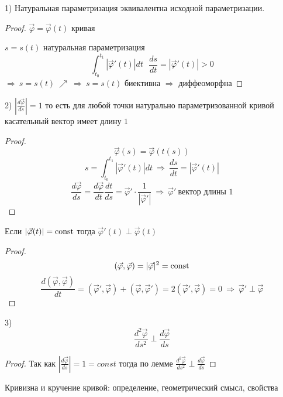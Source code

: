 \begin{block}[Свойства]
  1) Натуральная параметризация эквивалентна исходной параметризации.

  \begin{proof}
    $\vec \varphi = \vec \varphi(t)$ кривая

    $s = s(t)$ натуральная параметризация
    $$
    \int_{t_0}^{t_1} |\vec \varphi'(t)| dt ~~~
    \frac{ds}{dt} = |\vec \varphi'(t)| > 0
    $$
    $\Rightarrow ~ s = s(t) ~ \nearrow ~ \Rightarrow ~ s = s(t)$ биективна
    $\Rightarrow$ диффеоморфна
  \end{proof}

  2) $\left| \frac{d \vec \varphi}{ds} \right| = 1$ то есть для любой точки
  натурально параметризованной кривой касательный вектор имеет длину $1$

  \begin{proof}
    $$
    \vec \varphi(s) = \vec \varphi (t(s))
    $$
    $$
    s = \int_{t_0}^{t_1} |\vec \varphi'(t)| dt ~ \Rightarrow ~ \frac{ds}{dt} =
    |\vec \varphi'(t)|
    $$
    $$
    \frac{d\vec \varphi}{ds} = \frac{d \vec \varphi}{dt} \frac{dt}{ds} =
    \vec \varphi' \cdot \frac{1}{|\vec \varphi'|} ~ \Rightarrow ~ \vec \varphi'
    ~ \text{вектор длины 1}
    $$
  \end{proof}

  \begin{block}[Лемма]
    Если $|\vec \varphi(t)| = \mathrm{const}$ тогда $\vec \varphi'(t) \perp
    \vec \varphi(t)$
  \end{block}

  \begin{proof}
    $$
    (\vec \varphi, \vec \varphi) = |\vec \varphi|^2 = \mathrm{const}
    $$
    $$
    \frac{d(\vec \varphi, \vec \varphi)}{dt} = (\vec \varphi', \vec \varphi) +
    (\vec \varphi, \vec \varphi') = 2(\vec \varphi', \vec \varphi) = 0 ~
    \Rightarrow ~ \vec \varphi' \perp \vec \varphi
    $$
  \end{proof}

  3)
  $$
  \frac{d^2 \vec \varphi}{ds^2} \perp \frac{d\vec \varphi}{ds}
  $$
  \begin{proof}
    Так как $\left| \frac{d\vec \varphi}{ds} \right| = 1 = const$ тогда
    по лемме $\frac{d^2 \vec \varphi}{ds^2} \perp \frac{d\vec \varphi}{ds}$
  \end{proof}
\end{block}

\begin{title}[\Large]
  Кривизна и кручение кривой: определение, геометрический смысл, свойства
\end{title}

